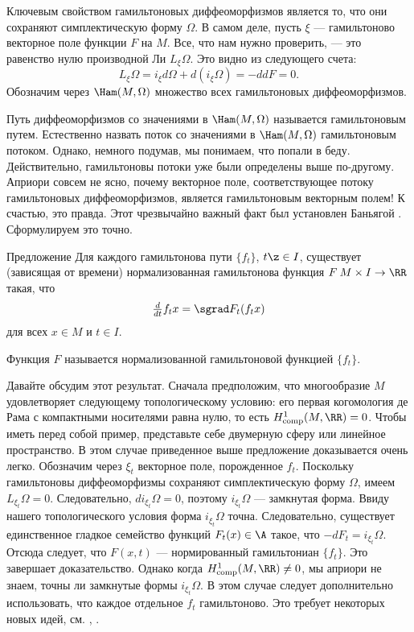 Ключевым свойством гамильтоновых диффеоморфизмов является то, что они сохраняют симплектическую форму $\Omega$.
В самом деле, пусть $\xi$ --- гамильтоново векторное поле функции $F$ на $M$.
Все, что нам нужно проверить, --- это равенство нулю производной Ли $L_\xi \Omega$.
Это видно из следующего счета: 
\[L_\xi \Omega = i_\xi d\Omega + d (i_\xi \Omega) = -ddF = 0.\]
Обозначим через $\Ham (M, \Omega)$ множество всех гамильтоновых диффеоморфизмов.

Путь диффеоморфизмов со значениями в $\Ham (M, \Omega)$ называется гамильтоновым путем.
Естественно назвать поток со значениями в $\Ham (M, \Omega)$ гамильтоновым потоком.
Однако, немного подумав, мы понимаем, что попали в беду.
Действительно, гамильтоновы потоки уже были определены выше по-другому.
Априори совсем не ясно, почему векторное поле, соответствующее потоку гамильтоновых диффеоморфизмов, является гамильтоновым векторным полем!
К счастью, это правда.
Этот чрезвычайно важный факт был установлен Баньягой \cite{B1}.
Сформулируем это точно.

\begin{thm}{Предложение}\label{1.4.B}
Для каждого гамильтонова пути $\{f_t\}$, $t \z\in I$, существует (зависящая от времени) нормализованная гамильтонова функция $F\: M \times I \to \RR$ такая, что 
\[\tfrac d{dt} f_t x = \sgrad F_t (f_t x)\]
для всех $x \in M$ и $t \in I$.
\end{thm}

Функция $F$ называется нормализованной гамильтоновой функцией $\{f_t\}$.

Давайте обсудим этот результат.
Сначала предположим, что многообразие $M$ удовлетворяет следующему топологическому условию: его первая когомология де Рама с компактными носителями равна нулю, то есть $H_{\mathrm{comp}}^1 (M, \RR) = 0$.
Чтобы иметь перед собой пример, представьте себе двумерную сферу или линейное пространство.
В этом случае приведенное выше предложение доказывается очень легко.
Обозначим через $\xi_t$ векторное поле, порожденное $f_t$.
Поскольку гамильтоновы диффеоморфизмы сохраняют симплектическую форму $\Omega$, имеем $L_{\xi_t} \Omega = 0$.
Следовательно, $di_{\xi_t} \Omega = 0$, поэтому $i_{\xi_t} \Omega$ --- замкнутая форма.
Ввиду нашего топологического условия форма $i_{\xi_t} \Omega$ точна.
Следовательно, существует единственное гладкое семейство функций $F_t (x) \in \A$ такое, что $-dF_t = i_{\xi_t} \Omega$.
Отсюда следует, что $F (x, t)$ --- нормированный гамильтониан $\{f_t\}$.
Это завершает доказательство.
Однако когда $H^1_{\mathrm{comp}} (M, \RR) \ne 0$, мы априори не знаем, точны ли замкнутые формы $i_{\xi_t} \Omega$.
В этом случае следует дополнительно использовать, что каждое отдельное $f_t$ гамильтоново.
Это требует некоторых новых идей, см. \cite{B1}, \cite{MS}.

